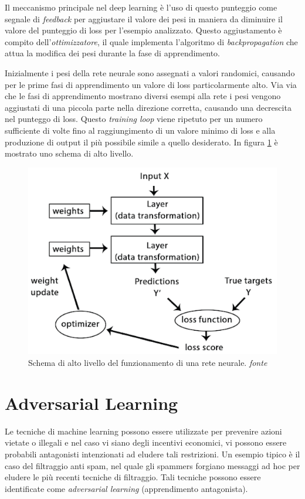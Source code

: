 Il meccanismo principale nel deep learning è l'uso di questo punteggio come segnale di \textit{feedback} per aggiustare il valore dei pesi in maniera da diminuire il valore del punteggio di loss per l'esempio analizzato. Questo aggiustamento è compito dell'\textit{ottimizzatore}, il quale implementa l'algoritmo di \textit{backpropagation} che attua la modifica dei pesi durante la fase di apprendimento.

Inizialmente i pesi della rete neurale sono assegnati a valori randomici, causando per le prime fasi di apprendimento un valore di loss particolarmente alto. Via via che le fasi di apprendimento mostrano diversi esempi alla rete i pesi vengono aggiustati di una piccola parte nella direzione corretta, causando una decrescita nel punteggo di loss. Questo \textit{training loop} viene ripetuto per un numero sufficiente di volte fino al raggiungimento di un valore minimo di loss e alla produzione di output il più possibile simile a quello desiderato. In figura \ref{fig:neuralloss} è mostrato uno schema di alto livello.

\begin{figure}[!htbp]
	\centering
	\includegraphics[width=0.8\columnwidth]{figures/deeploss.png}
	\caption{Schema di alto livello del funzionamento di una rete neurale. \textit{fonte}%
	 \cite{chollet2017deep} \label{fig:neuralloss} }
\end{figure}

\newpage
\section{Adversarial Learning}
Le tecniche di machine learning possono essere utilizzate per prevenire azioni vietate o illegali e nel caso vi siano degli incentivi economici, vi possono essere probabili antagonisti intenzionati ad eludere tali restrizioni. Un esempio tipico è il caso del filtraggio anti spam, nel quale gli spammers forgiano messaggi ad hoc per eludere le più recenti tecniche di filtraggio. Tali tecniche possono essere identificate come \textit{adversarial learning} (apprendimento antagonista).

